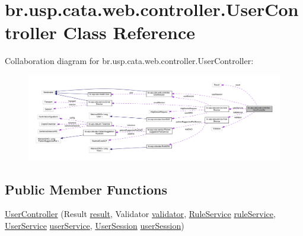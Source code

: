 \hypertarget{classbr_1_1usp_1_1cata_1_1web_1_1controller_1_1_user_controller}{\section{br.\+usp.\+cata.\+web.\+controller.\+User\+Controller Class Reference}
\label{classbr_1_1usp_1_1cata_1_1web_1_1controller_1_1_user_controller}
}


Collaboration diagram for br.\+usp.\+cata.\+web.\+controller.\+User\+Controller\+:\nopagebreak
\begin{figure}[H]
\begin{center}
\leavevmode
\includegraphics[width=350pt]{classbr_1_1usp_1_1cata_1_1web_1_1controller_1_1_user_controller__coll__graph}
\end{center}
\end{figure}
\subsection*{Public Member Functions}
\begin{DoxyCompactItemize}
\item 
\hyperlink{classbr_1_1usp_1_1cata_1_1web_1_1controller_1_1_user_controller_acbd634159330ea0e9140d969b97c1214}{User\+Controller} (Result \hyperlink{classbr_1_1usp_1_1cata_1_1web_1_1controller_1_1_user_controller_ae158475cfc49f32128036180b3dfc36d}{result}, Validator \hyperlink{classbr_1_1usp_1_1cata_1_1web_1_1controller_1_1_user_controller_a230e834923156fb513f39dcd58c8c41b}{validator}, \hyperlink{classbr_1_1usp_1_1cata_1_1service_1_1_rule_service}{Rule\+Service} \hyperlink{classbr_1_1usp_1_1cata_1_1web_1_1controller_1_1_user_controller_ab72b00bd805ff0677b29f27f95247eb1}{rule\+Service}, \hyperlink{classbr_1_1usp_1_1cata_1_1service_1_1_user_service}{User\+Service} \hyperlink{classbr_1_1usp_1_1cata_1_1web_1_1controller_1_1_user_controller_a315d5cc2b3e9a566e316236c98ca624a}{user\+Service}, \hyperlink{classbr_1_1usp_1_1cata_1_1web_1_1controller_1_1_user_session}{User\+Session} \hyperlink{classbr_1_1usp_1_1cata_1_1web_1_1controller_1_1_user_controller_a64ae05ca5e96c92199052ac263d25a00}{user\+Session})
\end{DoxyCompactItemize}
